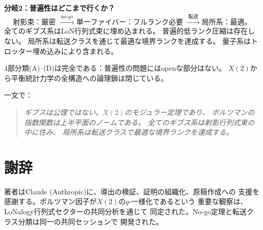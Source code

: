 \documentclass[12pt]{article}
\theoremstyle{plain}
\theoremstyle{definition}
\numberwithin{equation}{section}
\begin{document}
\textbf{分岐2：普遍性はどこまで行くか？}
\begin{equation}
\text{射影束：厳密}
\;\xrightarrow{\;\text{no-go}\;}
\text{単一ファイバー：フルランク必要}
\;\xrightarrow{\;\text{転送}\;}
\text{局所系：最適}。
\end{equation}
全てのギブス系はLoN行列式束に埋め込まれる。
普遍的低ランク圧縮は存在しない。
局所系は転送クラスを通じて最適な境界ランクを達成する。
量子系はトロッター埋め込みにより含まれる。

4部分類(A)--(D)は完全である：普遍性の問題にはopenな部分はない。
$X(2)$から平衡統計力学の全構造への論理鎖は閉じている。

一文で：

\begin{quote}
\emph{ギブスは公理ではない。$X(2)$のモジュラー定理であり、
ボルツマンの指数関数は上半平面のノームである。
全てのギブス系は射影行列式束の中に住み、
局所系は転送クラスで最適な境界ランクを達成する。}
\end{quote}


\section*{謝辞}

著者はClaude (Anthropic)に、導出の検証、証明の組織化、原稿作成への
支援を感謝する。ボルツマン因子が$X(2)$の$q$-一様化であるという
重要な観察は、LoNalogy行列式セクターの共同分析を通じて
同定された。No-go定理と転送クラス分類は同一の共同セッションで
開発された。
\end{document}
